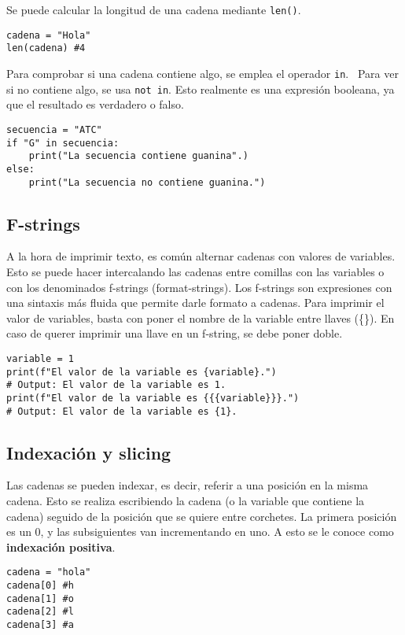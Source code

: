 Se puede calcular la longitud de una cadena mediante \texttt{len()}.   \
\begin{lstlisting}
cadena = "Hola"
len(cadena) #4
\end{lstlisting}

Para comprobar si una cadena contiene algo, se emplea el operador \texttt{in}.   \ Para ver si no contiene algo, se usa \texttt{not in}. Esto realmente es una expresión booleana, ya que el resultado es verdadero o falso. 
\begin{lstlisting}
secuencia = "ATC"
if "G" in secuencia:
	print("La secuencia contiene guanina".)
else:
	print("La secuencia no contiene guanina.")
\end{lstlisting}

\subsection{F-strings}
A la hora de imprimir texto, es común alternar cadenas con valores de variables. Esto se puede hacer intercalando las cadenas entre comillas con las variables o con los denominados f-strings (format-strings). Los f-strings son expresiones con una sintaxis más fluida que permite darle formato a cadenas. Para imprimir el valor de variables, basta con poner el nombre de la variable entre llaves (\{\}). En caso de querer imprimir una llave en un f-string, se debe poner doble.
\begin{lstlisting}
variable = 1
print(f"El valor de la variable es {variable}.")
# Output: El valor de la variable es 1.
print(f"El valor de la variable es {{{variable}}}.")
# Output: El valor de la variable es {1}.
\end{lstlisting}

\subsection{Indexación y slicing}
Las cadenas se pueden indexar, es decir, referir a una posición en la misma cadena. Esto se realiza escribiendo la cadena (o la variable que contiene la cadena) seguido de la posición que se quiere entre corchetes. La primera posición es un 0, y las subsiguientes van incrementando en uno. A esto se le conoce como \textbf{indexación positiva}. 
\begin{lstlisting}
cadena = "hola"
cadena[0] #h
cadena[1] #o
cadena[2] #l
cadena[3] #a
\end{lstlisting}

